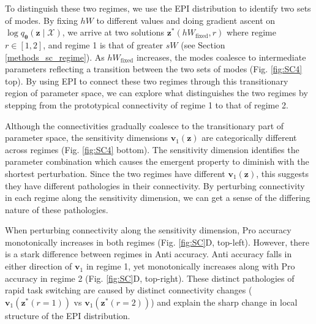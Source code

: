 \documentclass[11pt]{article}
\begin{document}
To distinguish these two regimes, we use the EPI distribution to identify two sets of modes.
By fixing $hW$ to different values and doing gradient ascent on $\log q_{\bm{\theta}}(\mathbf{z} \mid \mathcal{X})$, we arrive at two solutions $\mathbf{z}^*(hW_{\text{fixed}}, r)$ where regime $r \in [1,2]$, and regime 1 is that of greater $sW$ (see Section \ref{methods_sc_regime}).
As $hW_{\text{fixed}}$ increases, the modes coalesce to intermediate parameters reflecting a transition between the two sets of modes (Fig. \ref{fig:SC4} top).
By using EPI to connect these two regimes through this transitionary region of parameter space, we can explore what distinguishes the two regimes by stepping from the prototypical connectivity of regime 1 to that of regime 2.

Although the connectivities gradually coalesce to the transitionary part of parameter space, the sensitivity dimensions $\mathbf{v}_1(\mathbf{z})$ are categorically different across regimes (Fig. \ref{fig:SC4} bottom).
The sensitivity dimension identifies the parameter combination which causes the emergent property to diminish with the shortest perturbation.
Since the two regimes have different $\mathbf{v}_1(\mathbf{z})$, this suggests they have different pathologies in their connectivity.
By perturbing connectivity in each regime along the sensitivity dimension, we can get a sense of the differing nature of these pathologies.

When perturbing connectivity along the sensitivity dimension, Pro accuracy monotonically increases in both regimes (Fig. \ref{fig:SC}D, top-left).
However, there is a stark difference between regimes in Anti accuracy. 
Anti accuracy falls in either direction of $\mathbf{v}_1$ in regime 1, yet monotonically increases along with Pro accuracy in regime 2 (Fig. \ref{fig:SC}D, top-right).
These distinct pathologies of rapid task switching are caused by distinct connectivity changes ($\mathbf{v}_1(\mathbf{z}^*(r=1))$ vs $\mathbf{v}_1(\mathbf{z}^*(r=2))$) and explain the sharp change in local structure of the EPI distribution.
\end{document}
